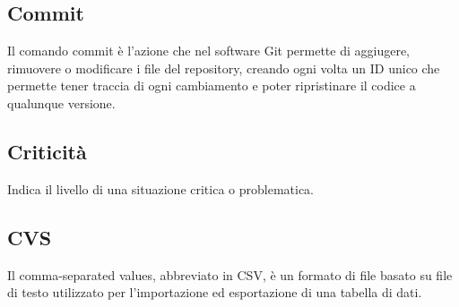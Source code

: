 \subsection*{Commit}
Il comando commit è l'azione che nel software Git permette di aggiugere, rimuovere o modificare i file del repository, creando ogni volta un ID unico che permette tener traccia di ogni cambiamento e poter ripristinare il codice a qualunque versione.

\subsection*{Criticità}
Indica il livello di una situazione critica o problematica.

\subsection*{CVS}
Il comma-separated values, abbreviato in CSV, è un formato di file basato su file di testo utilizzato per l'importazione ed esportazione di una tabella di dati.

